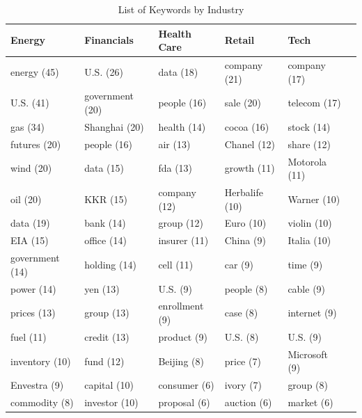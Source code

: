 \documentclass[pageno]{jpaper}
\begin{document}
\begin{table}
  \centering
    \begin{tabular}{| l | l | l | l | l | l |}
    \hline
    Energy & Financials & Health Care & Retail & Tech \\ \hline
    energy (45) & U.S. (26) & data (18) & company (21) & company (17) \\ \hline
    U.S. (41) & government (20) & people (16) & sale (20) & telecom (17) \\ \hline
    gas (34) & Shanghai (20) & health (14) & cocoa (16) & stock (14) \\ \hline
    futures (20) & people (16) & air (13) & Chanel (12) & share (12) \\ \hline
    wind (20) & data (15) & fda (13) & growth (11) & Motorola (11) \\ \hline
    oil (20) & KKR (15) & company (12) & Herbalife (10) & Warner (10) \\ \hline
    data (19) & bank (14) & group (12) & Euro (10) & violin (10) \\ \hline
    EIA (15) & office (14) & insurer (11) & China (9) & Italia (10) \\ \hline
    government (14) & holding (14) & cell (11) & car (9) & time (9) \\ \hline
    power (14) & yen (13) & U.S. (9) & people (8) & cable (9) \\ \hline
    prices (13) & group (13) & enrollment (9) & case (8) & internet (9) \\ \hline
    fuel (11) & credit (13) & product (9) & U.S. (8) & U.S. (9) \\ \hline
    inventory (10) & fund (12) & Beijing (8) & price (7) & Microsoft (9) \\ \hline
    Envestra (9) & capital (10) & consumer (6) & ivory (7) & group (8) \\ \hline
    commodity (8) & investor (10) & proposal (6) & auction (6) & market (6) \\
    \hline
  \end{tabular}
  \caption{List of Keywords by Industry}
  \label{table:formatting}
\end{table}
\end{document}
